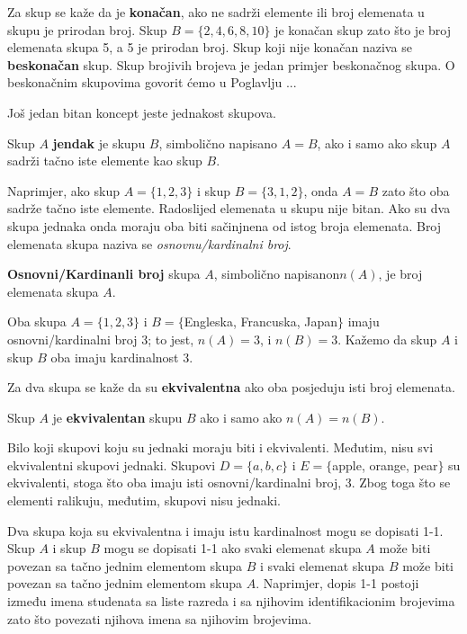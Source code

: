 \documentclass[a4paper, 14pt]{article}
\begin{document}
Za skup se kaže da je \textbf{konačan}, ako ne sadrži elemente ili broj elemenata u skupu je prirodan broj. Skup $B=\{2, 4, 6, 8, 10\}$ je konačan skup zato što je broj elemenata skupa 5, a 5 je prirodan broj. Skup koji nije konačan naziva se \textbf{beskonačan} skup. Skup brojivih brojeva je jedan primjer beskonačnog skupa. O beskonačnim skupovima govorit ćemo u Poglavlju ...\par\smallskip
Još jedan bitan koncept jeste jednakost skupova.\smallskip
\begin{tcolorbox}
Skup $A$ \textbf{jendak} je skupu $B$, simbolično napisano $A=B$, ako i samo ako skup $A$ sadrži tačno iste elemente kao skup $B$.
\end{tcolorbox}\smallskip
\noindent Naprimjer, ako skup $A=\{1, 2, 3\}$ i skup $B=\{3, 1, 2\}$, onda $A=B$ zato što oba sadrže tačno iste elemente. Radoslijed elemenata u skupu nije bitan. Ako su dva skupa jednaka onda moraju oba biti sačinjnena od istog broja elemenata. Broj elemenata skupa naziva se \textit{osnovnu/kardinalni broj}.\smallskip
\begin{tcolorbox}
\textbf{Osnovni/Kardinanli broj} skupa $A$, simbolično napisanon$n(A)$, je broj elemenata skupa $A$.
\end{tcolorbox}\smallskip
Oba skupa $A=\{1, 2, 3\}$ i $B=\{$Engleska, Francuska, Japan$\}$ imaju osnovni/kardinalni broj 3; to jest, $n(A)=3$, i $n(B)=3$. Kažemo da skup $A$ i skup $B$ oba imaju kardinalnost 3.\par
Za dva skupa se kaže da su \textbf{ekvivalentna} ako oba posjeduju isti broj elemenata.\smallskip
\begin{tcolorbox}
Skup $A$ je \textbf{ekvivalentan} skupu $B$ ako i samo ako $n(A)=n(B)$.
\end{tcolorbox}\smallskip
\noindent Bilo koji skupovi koju su jednaki moraju biti i ekvivalenti. Međutim, nisu svi ekvivalentni skupovi jednaki. Skupovi $D=\{a, b, c\}$ i $E=\{$apple, orange, pear$\}$ su ekvivalenti, stoga što oba imaju isti osnovni/kardinalni broj, 3. Zbog toga što se elementi ralikuju, međutim, skupovi nisu jednaki.\par
Dva skupa koja su ekvivalentna i  imaju istu kardinalnost mogu se dopisati 1-1. Skup $A$ i skup $B$ mogu se dopisati 1-1 ako svaki elemenat skupa $A$ može biti povezan sa tačno jednim elementom skupa $B$ i svaki elemenat skupa $B$ može biti povezan sa tačno jednim elementom skupa $A$. Naprimjer, dopis 1-1 postoji između imena studenata sa liste razreda i sa njihovim identifikacionim brojevima zato što povezati njihova imena sa njihovim brojevima.\smallskip
\end{document}
